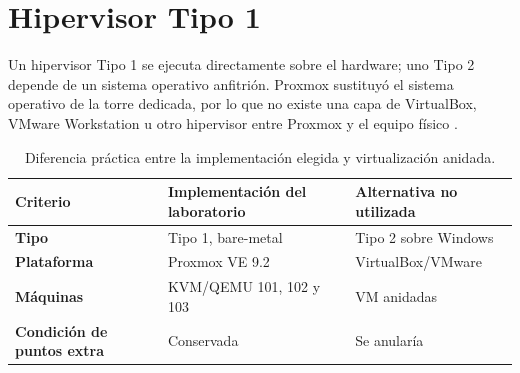 \section{Hipervisor Tipo 1}

Un hipervisor Tipo 1 se ejecuta directamente sobre el hardware; uno Tipo 2 depende de un sistema operativo anfitrión. Proxmox sustituyó el sistema operativo de la torre dedicada, por lo que no existe una capa de VirtualBox, VMware Workstation u otro hipervisor entre Proxmox y el equipo físico \cite{proxmox-install}.

\begin{table}[H]
  \centering
  \begin{tabularx}{\linewidth}{>{\bfseries}lYY}
    \toprule
    Criterio & Implementación del laboratorio & Alternativa no utilizada \\
    \midrule
    Tipo & Tipo 1, bare-metal & Tipo 2 sobre Windows \\
    Plataforma & Proxmox VE 9.2 & VirtualBox/VMware \\
    Máquinas & KVM/QEMU 101, 102 y 103 & VM anidadas \\
    Condición de puntos extra & Conservada & Se anularía \\
    \bottomrule
  \end{tabularx}
  \caption{Diferencia práctica entre la implementación elegida y virtualización anidada.}
\end{table}


